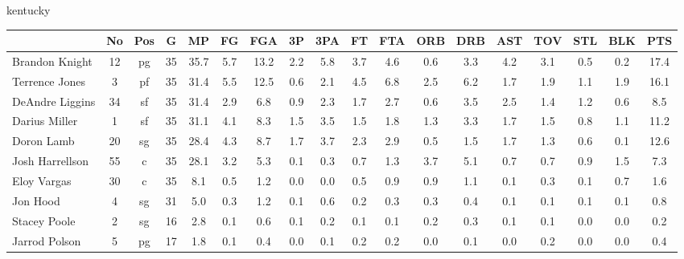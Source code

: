 \documentclass[10pt]{article}
\begin{document}
\begin{center}
kentucky 
\end{center}
\begin{table}[ht]
\begin{center}
\begin{tabular}{lccccccccccccccccc}
  \hline
 & No & Pos & G & MP & FG & FGA & 3P & 3PA & FT & FTA & ORB & DRB & AST & TOV & STL & BLK & PTS \\ 
  \hline
Brandon Knight & 12 & pg & 35 & 35.7 & 5.7 & 13.2 & 2.2 & 5.8 & 3.7 & 4.6 & 0.6 & 3.3 & 4.2 & 3.1 & 0.5 & 0.2 & 17.4 \\ 
  Terrence Jones & 3 & pf & 35 & 31.4 & 5.5 & 12.5 & 0.6 & 2.1 & 4.5 & 6.8 & 2.5 & 6.2 & 1.7 & 1.9 & 1.1 & 1.9 & 16.1 \\ 
  DeAndre Liggins & 34 & sf & 35 & 31.4 & 2.9 & 6.8 & 0.9 & 2.3 & 1.7 & 2.7 & 0.6 & 3.5 & 2.5 & 1.4 & 1.2 & 0.6 & 8.5 \\ 
  Darius Miller & 1 & sf & 35 & 31.1 & 4.1 & 8.3 & 1.5 & 3.5 & 1.5 & 1.8 & 1.3 & 3.3 & 1.7 & 1.5 & 0.8 & 1.1 & 11.2 \\ 
  Doron Lamb & 20 & sg & 35 & 28.4 & 4.3 & 8.7 & 1.7 & 3.7 & 2.3 & 2.9 & 0.5 & 1.5 & 1.7 & 1.3 & 0.6 & 0.1 & 12.6 \\ 
  Josh Harrellson & 55 & c & 35 & 28.1 & 3.2 & 5.3 & 0.1 & 0.3 & 0.7 & 1.3 & 3.7 & 5.1 & 0.7 & 0.7 & 0.9 & 1.5 & 7.3 \\ 
  Eloy Vargas & 30 & c & 35 & 8.1 & 0.5 & 1.2 & 0.0 & 0.0 & 0.5 & 0.9 & 0.9 & 1.1 & 0.1 & 0.3 & 0.1 & 0.7 & 1.6 \\ 
  Jon Hood & 4 & sg & 31 & 5.0 & 0.3 & 1.2 & 0.1 & 0.6 & 0.2 & 0.3 & 0.3 & 0.4 & 0.1 & 0.1 & 0.1 & 0.1 & 0.8 \\ 
  Stacey Poole & 2 & sg & 16 & 2.8 & 0.1 & 0.6 & 0.1 & 0.2 & 0.1 & 0.1 & 0.2 & 0.3 & 0.1 & 0.1 & 0.0 & 0.0 & 0.2 \\ 
  Jarrod Polson & 5 & pg & 17 & 1.8 & 0.1 & 0.4 & 0.0 & 0.1 & 0.2 & 0.2 & 0.0 & 0.1 & 0.0 & 0.2 & 0.0 & 0.0 & 0.4 \\ 
   \hline
\end{tabular}
\end{center}
\end{table}
\end{document}
